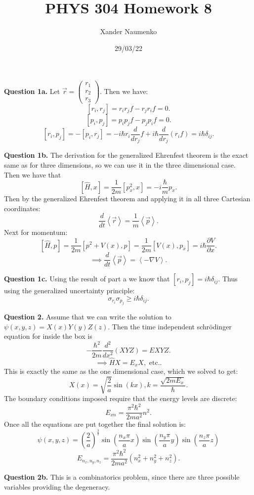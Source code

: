 \documentclass[letterpaper, reqno,11pt]{article}
\begin{document}
\title{PHYS 304 Homework 8}
\date{29/03/22}
\author{Xander Naumenko}
\maketitle

{\noindent\bf Question 1a.} Let $\vec r=\begin{pmatrix} r_1\\r_2\\r_3 \end{pmatrix} $. Then we have: 
\[
[r_i,r_j]=r_ir_jf-r_jr_if=0
.\]
\[
[p_i,p_j]=p_ip_jf-p_jp_if=0
.\]
\[
[r_i, p_j]=-[p_i, r_j]=-i\hbar r_i \frac{d}{dr_j}f+i\hbar \frac{d}{dr_j}\left( r_i f \right) = i\hbar\delta_{ij}
.\]

{\noindent\bf Question 1b.} The derivation for the generalized Ehrenfest theorem is the exact same as for three dimensions, so we can use it in the three dimensional case. Then we have that 
\[
[\hat H, x]=\frac{1}{2m}[p_x^2, x]=-i \frac{\hbar}{m}p_x
.\]
Then by the generalized Ehrenfest theorem and applying it in all three Cartesian coordinates: 
\[
\frac{d}{dt}\left<\vec r \right>=\frac{1}{m}\left<\vec p \right>
.\]
Next for momentum: 
\[
[\hat H, p]=\frac{1}{2m}[p^2+V(x), p]=\frac{1}{2m}[V(x), p_x]=i\hbar \frac{\partial V}{\partial x}
.\]
\[
\implies \frac{d}{dt}\left<\vec p \right>=\left<-\nabla V \right>
.\]

{\noindent\bf Question 1c.} Using the result of part a we know that $[r_i,p_j]=i\hbar\delta_{ij}$. Thus using the generalized uncertainty principle: 
\[
\sigma_{r_i}\sigma_{p_j}\geq i\hbar\delta_{ij}
.\]

{\noindent\bf Question 2.} Assume that we can write the solution to $\psi(x, y, z)=X(x)Y(y)Z(z)$. Then the time independent schr\"odinger equation for inside the box is
\[
-\frac{\hbar^2}{2m} \frac{d^2}{dx^2} (XYZ)=EXYZ
.\]
\[
\implies \hat H X=E_xX, \text{ etc.}
.\]
This is exactly the same as the one dimensional case, which we solved to get: 
\[
X(x)=\sqrt{\frac{2}{a}}\sin(kx), k=\frac{\sqrt{2mE_x} }{\hbar}
.\]
The boundary conditions imposed require that the energy levels are discrete: 
\[
E_{xn}=\frac{\pi^2 \hbar^2}{2ma^2}n^2
.\]
Once all the equations are put together the final solution is: 
\[
\psi(x, y, z)=\left( \frac{2}{a} \right) ^\frac{3}{2}\sin(\frac{n_x\pi}{a}x)\sin(\frac{n_y\pi}{a}y)\sin(\frac{n_z\pi}{a}z)
\]
\[
E_{n_x, n_y, n_z}=\frac{\pi^2 \hbar^2}{2ma^2}\left( n_x^2+n_y^2+n_z^2 \right) 
.\]

{\noindent\bf Question 2b.} This is a combinatorics problem, since there are three possible variables providing the degeneracy. 
\end{document}
